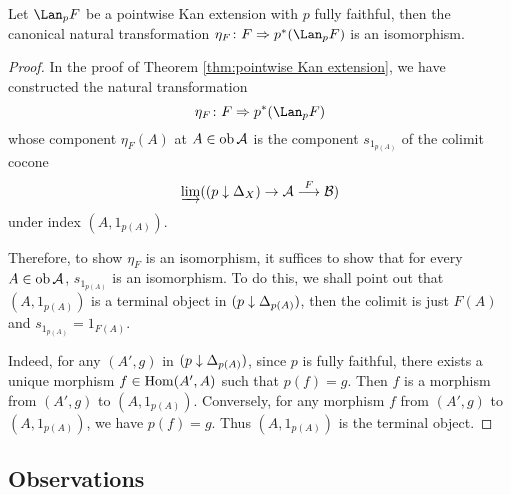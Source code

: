   \begin{prop}
    Let $\Lan_pF$ be a pointwise Kan extension with $p$ fully faithful, then the canonical natural transformation $\eta_F\colon F\then p^{\ast}(\Lan_pF)$ is an isomorphism.
  \end{prop}
  \begin{proof}
    In the proof of Theorem \ref{thm:pointwise Kan extension}, we have constructed the natural transformation
    \begin{equation*}
      \eta_F\colon F\then p^{\ast}(\Lan_pF)
    \end{equation*}
    whose component $\eta_F(A)$ at $A\in\operatorname{ob}{\cal A}$ is the component $s_{1_{p(A)}}$ of the colimit cocone
    \begin{equation*}
      \operatorname*{\underrightarrow{\lim}}((p\downarrow\Delta_X)\to{\cal A}\stackrel{{F}}{\longrightarrow}{\cal B})
    \end{equation*}
    under index $(A,1_{p(A)})$.

    Therefore, to show $\eta_F$ is an isomorphism, it suffices to show that for every $A\in\operatorname{ob}{\cal A}$, $s_{1_{p(A)}}$ is an isomorphism. To do this, we shall point out that $(A,1_{p(A)})$ is a terminal object in $(p\downarrow\Delta_{p(A)})$, then the colimit is just $F(A)$ and $s_{1_{p(A)}}=1_{F(A)}$.

    Indeed, for any $(A',g)$ in $(p\downarrow\Delta_{p(A)})$, since $p$ is fully faithful, there exists a unique morphism $f\in\operatorname{Hom}(A',A)$ such that $p(f)=g$. Then $f$ is a morphism from $(A',g)$ to $(A,1_{p(A)})$. Conversely, for any morphism $f$ from $(A',g)$ to $(A,1_{p(A)})$, we have $p(f)=g$. Thus $(A,1_{p(A)})$ is the terminal object.
  \end{proof}

\subsection{Observations}


